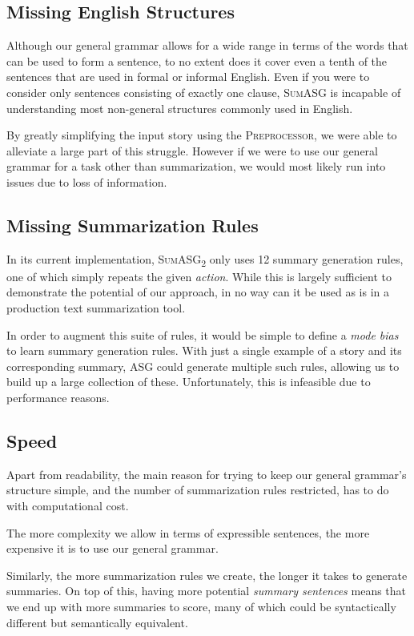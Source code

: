 \subsection{Missing English Structures}

Although our general grammar allows for a wide range in terms of the words that can be used to form a sentence, to no extent does it cover even a tenth of the sentences that are used in formal or informal English. Even if you were to consider only sentences consisting of exactly one clause, \textsc{SumASG} is incapable of understanding most non-general structures commonly used in English.

By greatly simplifying the input story using the \textsc{Preprocessor}, we were able to alleviate a large part of this struggle. However if we were to use our general grammar for a task other than summarization, we would most likely run into issues due to loss of information.

\subsection{Missing Summarization Rules}

In its current implementation, \textsc{SumASG\textsubscript{2}} only uses 12 summary generation rules, one of which simply repeats the given \textit{action}. While this is largely sufficient to demonstrate the potential of our approach, in no way can it be used as is in a production text summarization tool.

In order to augment this suite of rules, it would be simple to define a \textit{mode bias} to learn summary generation rules. With just a single example of a story and its corresponding summary, ASG could generate multiple such rules, allowing us to build up a large collection of these. Unfortunately, this is infeasible due to performance reasons.

\subsection{Speed}

Apart from readability, the main reason for trying to keep our general grammar's structure simple, and the number of summarization rules restricted, has to do with computational cost.

The more complexity we allow in terms of expressible sentences, the more expensive it is to use our general grammar.

Similarly, the more summarization rules we create, the longer it takes to generate summaries. On top of this, having more potential \textit{summary sentences} means that we end up with more summaries to score, many of which could be syntactically different but semantically equivalent.

